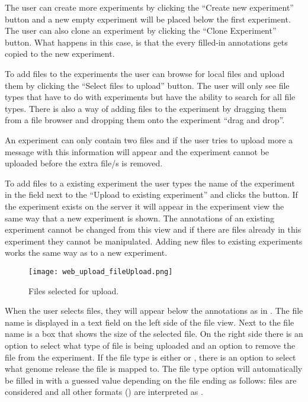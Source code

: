 The user can create more experiments by clicking the “Create new experiment” button and a new empty experiment will be placed below the first experiment. The user can also clone an experiment by clicking the “Clone Experiment” button. What happens in this case, is that the every filled-in annotations gets copied to the new experiment.

To add files to the experiments the user can browse for local files and upload them by clicking the “Select files to upload” button. The user will only see file types that have to do with experiments but have the ability to search for all file types. There is also a way of adding files to the experiment by dragging them from a file browser and dropping them onto the experiment “drag and drop”.

An experiment can only contain two  files and if the user tries to upload more a message with this information will appear and the experiment cannot be uploaded before the extra  file/s is removed. 

To add files to a existing experiment the user types the name of the experiment in the field next to the “Upload to existing experiment” and clicks the button. If the experiment exists on the server it will appear in the experiment view the same way that a new experiment is shown. The annotations of an existing experiment cannot be changed from this view and if there are files already in this experiment they cannot be manipulated. Adding new files to existing experiments works the same way as to a new experiment.

\begin{figure}[h]
\centering
\texttt{[image: web\_upload\_fileUpload.png]}
\caption{\label{fig:web_upload_fileUpload}Files selected for upload.}
\end{figure}
 
When the user selects files, they will appear below the annotations as in . The file name is displayed in a text field on the left side of the file view. Next to the file name is a box that shows the size of the selected file. On the right side there is an option to select what type of file is being uploaded and an option to remove the file from the experiment. If the file type is either  or , there is an option to select what genome release the file is mapped to. The file type option will automatically be filled in with a guessed value depending on the file ending as follows:  files are considered  and all other formats () are interpreted as .

